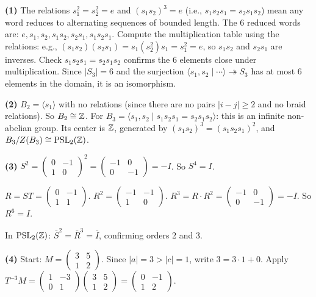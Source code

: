 \documentclass{report}
\begin{document}
\begin{solution}
\textbf{(1)} The relations \(s_1^2 = s_2^2 = e\) and \((s_1 s_2)^3 = e\) (i.e., \(s_1 s_2 s_1 = s_2 s_1 s_2\)) mean any word reduces to alternating sequences of bounded length. The 6 reduced words are: \(e, s_1, s_2, s_1 s_2, s_2 s_1, s_1 s_2 s_1\). Compute the multiplication table using the relations: e.g., \((s_1 s_2)(s_2 s_1) = s_1 (s_2^2) s_1 = s_1^2 = e\), so \(s_1 s_2\) and \(s_2 s_1\) are inverses. Check \(s_1 s_2 s_1 = s_2 s_1 s_2\) confirms the 6 elements close under multiplication. Since \(|S_3| = 6\) and the surjection \(\langle s_1, s_2 \mid \cdots \rangle \twoheadrightarrow S_3\) has at most 6 elements in the domain, it is an isomorphism.

\textbf{(2)} \(B_2 = \langle s_1 \rangle\) with no relations (since there are no pairs \(|i - j| \geq 2\) and no braid relations). So \(B_2 \cong \ZZ\). For \(B_3 = \langle s_1, s_2 \mid s_1 s_2 s_1 = s_2 s_1 s_2 \rangle\): this is an infinite non-abelian group. Its center is \(\ZZ\), generated by \((s_1 s_2)^3 = (s_1 s_2 s_1)^2\), and \(B_3 / Z(B_3) \cong \mathrm{PSL}_2(\ZZ)\).

\textbf{(3)} \(S^2 = \begin{pmatrix} 0 & -1 \\ 1 & 0 \end{pmatrix}^2 = \begin{pmatrix} -1 & 0 \\ 0 & -1 \end{pmatrix} = -I\). So \(S^4 = I\).

\(R = ST = \begin{pmatrix} 0 & -1 \\ 1 & 1 \end{pmatrix}\). \(R^2 = \begin{pmatrix} -1 & -1 \\ 1 & 0 \end{pmatrix}\). \(R^3 = R \cdot R^2 = \begin{pmatrix} -1 & 0 \\ 0 & -1 \end{pmatrix} = -I\). So \(R^6 = I\).

In \(\mathrm{PSL}_2(\ZZ)\): \(\bar{S}^2 = \bar{R}^3 = \bar{I}\), confirming orders 2 and 3.

\textbf{(4)} Start: \(M = \begin{pmatrix} 3 & 5 \\ 1 & 2 \end{pmatrix}\). Since \(|a| = 3 > |c| = 1\), write \(3 = 3 \cdot 1 + 0\). Apply \(T^{-3} M = \begin{pmatrix} 1 & -3 \\ 0 & 1 \end{pmatrix} \begin{pmatrix} 3 & 5 \\ 1 & 2 \end{pmatrix} = \begin{pmatrix} 0 & -1 \\ 1 & 2 \end{pmatrix}\).


\end{solution}
\end{document}
